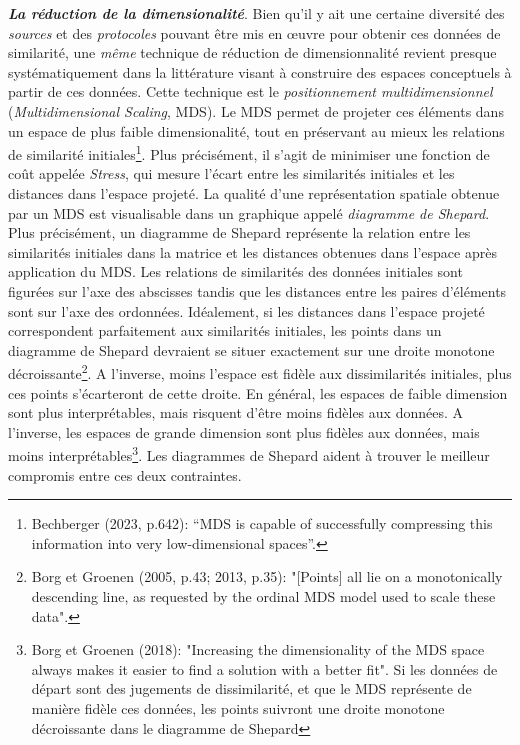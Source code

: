 \documentclass{article}
\newcommand{\bolditalic}[1]{\textbf{\textit{#1}}}
\begin{document}
\par
\bolditalic{La réduction de la dimensionalité}. Bien qu’il y ait une certaine diversité des \textit{sources} et des \textit{protocoles} pouvant être mis en œuvre pour obtenir ces données de similarité, une \textit{même} technique de réduction de dimensionnalité revient presque systématiquement dans la littérature visant à construire des espaces conceptuels à partir de ces données. Cette technique est le \textit{positionnement multidimensionnel} (\textit{Multidimensional Scaling}, MDS). Le MDS permet de projeter ces éléments dans un espace de plus faible dimensionalité, tout en préservant au mieux les relations de similarité initiales\footnote{Bechberger (2023, p.642): “MDS is capable of successfully compressing this information into very low-dimensional spaces”.}. Plus précisément, il s’agit de minimiser une fonction de coût appelée \textit{Stress}, qui mesure l’écart entre les similarités initiales et les distances dans l'espace projeté. La qualité d’une représentation spatiale obtenue par un MDS est visualisable dans un graphique appelé \textit{diagramme de Shepard}. Plus précisément, un diagramme de Shepard représente la relation entre les similarités initiales dans la matrice et les distances obtenues dans l’espace après application du MDS. Les relations de similarités des données initiales sont figurées sur l’axe des abscisses tandis que les distances entre les paires d’éléments sont sur l’axe des ordonnées. Idéalement, si les distances dans l’espace projeté correspondent parfaitement aux similarités initiales, les points dans un diagramme de Shepard devraient se situer exactement sur une droite monotone décroissante\footnote{Borg et Groenen (2005, p.43; 2013, p.35): "[Points] all lie on a monotonically descending line, as requested by the ordinal MDS model used to scale these data".}. A l’inverse, moins l’espace est fidèle aux dissimilarités initiales, plus ces points s’écarteront de cette droite. En général, les espaces de faible dimension sont plus interprétables, mais risquent d’être moins fidèles aux données. A l’inverse, les espaces de grande dimension sont plus fidèles aux données, mais moins interprétables\footnote{Borg et Groenen (2018): "Increasing the dimensionality of the MDS space always makes it easier to find a solution with a better fit". Si les données de départ sont des jugements de dissimilarité, et que le MDS représente de manière fidèle ces données, les points suivront une droite monotone décroissante dans le diagramme de Shepard}. Les diagrammes de Shepard aident à trouver le meilleur compromis entre ces deux contraintes.
\end{document}
